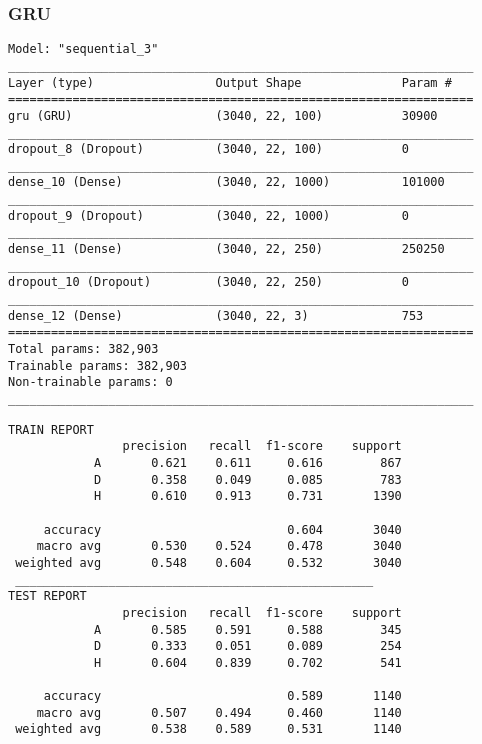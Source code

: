 \subsubsection*{GRU}
\begin{lstlisting}[style=arch]
Model: "sequential_3"
_________________________________________________________________
Layer (type)                 Output Shape              Param #   
=================================================================
gru (GRU)                    (3040, 22, 100)           30900     
_________________________________________________________________
dropout_8 (Dropout)          (3040, 22, 100)           0         
_________________________________________________________________
dense_10 (Dense)             (3040, 22, 1000)          101000    
_________________________________________________________________
dropout_9 (Dropout)          (3040, 22, 1000)          0         
_________________________________________________________________
dense_11 (Dense)             (3040, 22, 250)           250250    
_________________________________________________________________
dropout_10 (Dropout)         (3040, 22, 250)           0         
_________________________________________________________________
dense_12 (Dense)             (3040, 22, 3)             753       
=================================================================
Total params: 382,903
Trainable params: 382,903
Non-trainable params: 0
_________________________________________________________________

\end{lstlisting}

\begin{lstlisting}[style=report]
TRAIN REPORT
                precision   recall  f1-score    support
            A       0.621    0.611     0.616        867
            D       0.358    0.049     0.085        783
            H       0.610    0.913     0.731       1390

     accuracy                          0.604       3040
    macro avg       0.530    0.524     0.478       3040
 weighted avg       0.548    0.604     0.532       3040
 __________________________________________________
TEST REPORT
                precision   recall  f1-score    support
            A       0.585    0.591     0.588        345
            D       0.333    0.051     0.089        254
            H       0.604    0.839     0.702        541

     accuracy                          0.589       1140
    macro avg       0.507    0.494     0.460       1140
 weighted avg       0.538    0.589     0.531       1140
\end{lstlisting}


